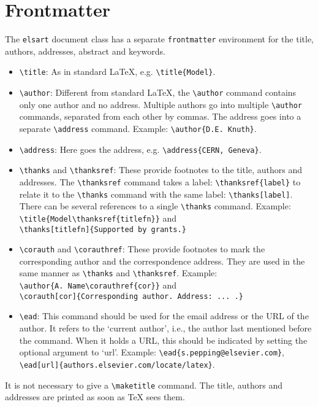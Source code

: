 \documentclass{elsart}
\begin{document}
\section{Frontmatter}
\label{frontmatter}

The \texttt{elsart} document class has a separate 
\texttt{frontmatter} environment for the title, authors, addresses,
abstract and keywords.
\begin{itemize}
\item \verb|\title|: As in standard \LaTeX, e.g. 
\verb|\title{Model}|.
\item \verb|\author|: Different from standard \LaTeX, the \verb|\author|
command contains only one author and no address.
Multiple authors go into multiple \verb|\author| commands,
separated from each other by commas.
The address goes into a separate 
\verb|\address| command.
Example: \verb|\author{D.E. Knuth}|.
\item \verb|\address|: Here goes the address, e.g. 
\verb|\address{CERN, Geneva}|.
\item \verb|\thanks| and \verb|\thanksref|: 
These provide footnotes to the title, authors and addresses. 
The \verb|\thanksref| command takes a label: \verb|\thanksref{label}|
to relate it to the \verb|\thanks| command with 
the same label: \verb|\thanks[label]|. There can be several
references to a single \verb|\thanks| command. Example:\\
\verb|\title{Model\thanksref{titlefn}}| and\\
\verb|\thanks[titlefn]{Supported by grants.}|
\item \verb|\corauth| and \verb|\corauthref|: 
These provide footnotes to mark the corresponding author and the
correspondence address. They are used in the same manner as
\verb|\thanks| and \verb|\thanksref|. Example:\\
\verb|\author{A. Name\corauthref{cor}}| and\\
\verb|\corauth[cor]{Corresponding author. Address: ... .}|
\item \verb|\ead|:
This command should be used for the email address or the URL of the
author. It refers to the `current author', i.e., the author last
mentioned before the command.
When it holds a URL, this should be indicated by setting the
optional argument to `url'. Example:
\verb|\ead{s.pepping@elsevier.com}|,
\verb|\ead[url]{authors.elsevier.com/locate/latex}|.
\end{itemize}

It is not necessary to give a \verb|\maketitle| command. The title,
authors and addresses are printed as soon as \TeX{} sees them.
\end{document}
